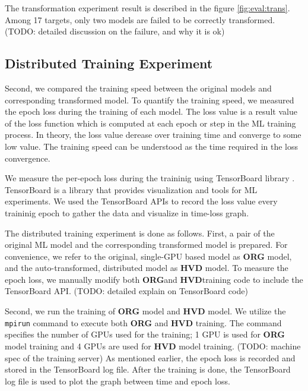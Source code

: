 The transformation experiment result is described in the 
figure \ref{fig:eval:trans}. Among 17 targets, only two models are failed to
be correctly transformed.
(TODO: detailed discussion on the failure, and why it is ok)

\subsection{Distributed Training Experiment}

Second, we compared the training speed between the original models and
corresponding transformed model. 
To quantify the training speed, we measured the epoch loss during the training
of each model.
The loss value is a result value of the loss function which is computed
at each epoch or step in the ML training process.
In theory, the loss value derease over training time and converge
to some low value.
The training speed can be understood as the time required in the
loss convergence.

We measure the per-epoch loss during the traininig using
TensorBoard library \cite{tensorboard}. 
TensorBoard is a library that provides visualization and tools
for ML experiments.
We used the TensorBoard APIs to record the loss value every traininig epoch
to gather the data and visualize in time-loss graph.

\newcommand{\orgbf}{\textbf{ORG}}
\newcommand{\hvdbf}{\textbf{HVD}}

The distributed training experiment is done as follows.
First, a pair of the original ML model and the corresponding transformed model
is prepared. For convenience, we refer to the original, single-GPU based model
as \textbf{ORG} model, and the auto-transformed, distributed model as
\textbf{HVD} model. To measure the epoch loss, we manually modify both  
\orgbf and \hvdbf training code to include the TensorBoard API. 
(TODO: detailed explain on TensorBoard code)

Second, we run the training of \textbf{ORG} model and
\textbf{HVD} model. We utilize the {\tt mpirun} command to execute both
\textbf{ORG} and \textbf{HVD} training. The command specifies the number of
GPUs used for the training; 1 GPU is used for \textbf{ORG} model training  
and 4 GPUs are used for \textbf{HVD} model training. 
(TODO: machine spec of the training server)
As mentioned earlier, the epoch loss is recorded and stored in the
TensorBoard log file.
After the training is done, the TensorBoard log file is used to plot the
graph between time and epoch loss. 

